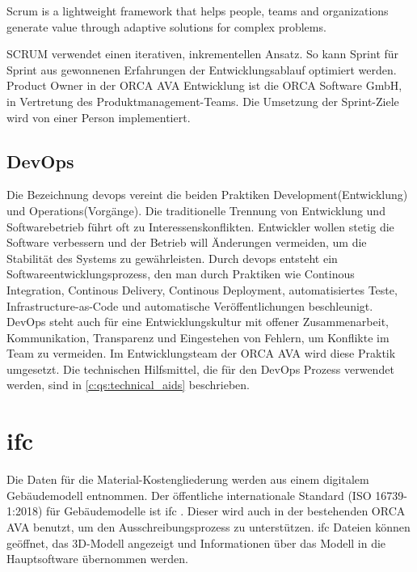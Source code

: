 \begin{definition}[Scrum]
	\glqq Scrum is a lightweight framework that helps people, teams and organizations generate value through adaptive solutions for complex problems. \grqq{} \citep[vgl.][p.~3]{scrum_2020}
\end{definition}

SCRUM verwendet einen iterativen, inkrementellen Ansatz. So kann Sprint für Sprint aus gewonnenen Erfahrungen der Entwicklungsablauf optimiert werden. \citep[vgl.][]{scrum_2020} Product Owner in der ORCA AVA Entwicklung ist die \glqq ORCA Software GmbH\grqq{}, in Vertretung des Produktmanagement-Teams. Die Umsetzung der Sprint-Ziele wird von einer Person implementiert.

\subsection{DevOps}
\label{c:basics:project-management:devops}
Die Bezeichnung \ac{devops} vereint die beiden Praktiken \glqq Development\grqq{}(Entwicklung) und \glqq Operations\grqq{}(Vorgänge). Die traditionelle Trennung von Entwicklung und Softwarebetrieb führt oft zu
Interessenskonflikten. Entwickler wollen stetig die Software verbessern und der Betrieb will Änderungen vermeiden, um die Stabilität des Systems zu gewährleisten. Durch \ac{devops} entsteht ein Softwareentwicklungsprozess, den man durch Praktiken wie Continous Integration, Continous Delivery, Continous Deployment, automatisiertes Teste, Infrastructure-as-Code und automatische Veröffentlichungen beschleunigt. DevOps steht auch für eine Entwicklungskultur mit offener Zusammenarbeit, Kommunikation, Transparenz und Eingestehen von Fehlern, um Konflikte im Team zu vermeiden. \citep[vgl.][]{devops_2021} Im Entwicklungsteam der ORCA AVA wird diese Praktik umgesetzt. Die technischen Hilfsmittel, die für den DevOps Prozess verwendet werden, sind in \autoref{c:qs:technical_aids} beschrieben.

\section{\acf{ifc}}
\label{c:basics:ifc}
Die Daten für die Material-Kostengliederung werden aus einem digitalem Gebäudemodell entnommen. Der öffentliche internationale Standard (ISO 16739-1:2018) für Gebäudemodelle ist \ac{ifc} \citep[vgl.][]{BuildingSMART_IFC4_doc}. Dieser wird auch in der bestehenden ORCA AVA benutzt, um den Ausschreibungsprozess zu unterstützen. \ac{ifc} Dateien können geöffnet, das 3D-Modell angezeigt und Informationen über das Modell in die Hauptsoftware übernommen werden.

